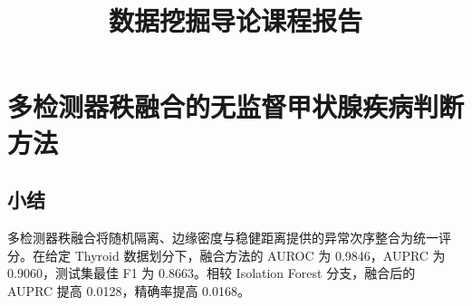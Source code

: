 \documentclass[sigconf,nonacm,screen]{acmart}
\title[数据挖掘导论课程报告]{数据挖掘导论课程报告}
\begin{document}
\maketitle

\section{多检测器秩融合的无监督甲状腺疾病判断方法}
\label{sec:task4}



\subsection{小结}
多检测器秩融合将随机隔离、边缘密度与稳健距离提供的异常次序整合为统一评分。在给定 Thyroid 数据划分下，融合方法的 AUROC 为 0.9846，AUPRC 为 0.9060，测试集最佳 F1 为 0.8663。相较 Isolation Forest 分支，融合后的 AUPRC 提高 0.0128，精确率提高 0.0168。



\end{document}
